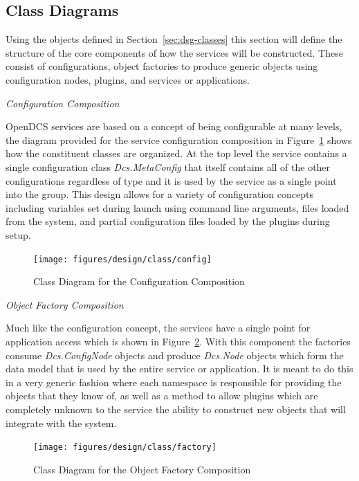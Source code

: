   \subsection{Class Diagrams}\label{sec:dsg-class-dia}

    Using the objects defined in Section~\ref{sec:dsg-classes} this section will
    define the structure of the core components of how the services will be
    constructed. These consist of configurations, object factories to produce
    generic objects using configuration nodes, plugins, and services or
    applications.

    \emph{Configuration Composition}

    OpenDCS services are based on a concept of being configurable at many
    levels, the diagram provided for the service configuration composition
    in Figure~\ref{fig:dsg-class-config} shows how the constituent
    classes are organized. At the top level the service contains a single
    configuration class \emph{Dcs.MetaConfig} that itself contains all of
    the other configurations regardless of type and it is used by the
    service as a single point into the group. This design allows for
    a variety of configuration concepts including variables set during
    launch using command line arguments, files loaded from the system,
    and partial configuration files loaded by the plugins during setup.

    \begin{figure}[H]
      \texttt{[image: figures/design/class/config]}
      \caption{Class Diagram for the Configuration Composition}
      \label{fig:dsg-class-config}
    \end{figure}

    \emph{Object Factory Composition}

    Much like the configuration concept, the services have a single point for
    application access which is shown in Figure~\ref{fig:dsg-class-factory}.
    With this component the factories consume \emph{Dcs.ConfigNode} objects
    and produce \emph{Dcs.Node} objects which form the data model that is used
    by the entire service or application. It is meant to do this in a very
    generic fashion where each namespace is responsible for providing the
    objects that they know of, as well as a method to allow plugins which are
    completely unknown to the service the ability to construct new objects that
    will integrate with the system.

    \begin{figure}[H]
      \texttt{[image: figures/design/class/factory]}
      \caption{Class Diagram for the Object Factory Composition}
      \label{fig:dsg-class-factory}
    \end{figure}


